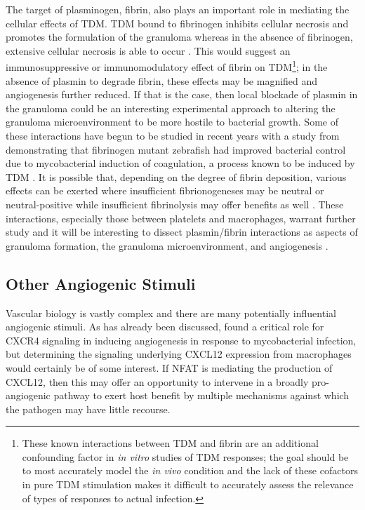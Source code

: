 The target of plasminogen, fibrin, also plays an important role in mediating the cellular effects of TDM. TDM bound to fibrinogen inhibits cellular necrosis and promotes the formulation of the granuloma whereas in the absence of fibrinogen, extensive cellular necrosis is able to occur \citep{Sakamoto2010}. This would suggest an immunosuppressive or immunomodulatory effect of fibrin on TDM\footnote{These known interactions between TDM and fibrin are an additional confounding factor in \textit{in vitro} studies of TDM responses; the goal should be to most accurately model the \textit{in vivo} condition and the lack of these cofactors in pure TDM stimulation makes it difficult to accurately assess the relevance of types of responses to actual infection.}; in the absence of plasmin to degrade fibrin, these effects may be magnified and angiogenesis further reduced. If that is the case, then local blockade of plasmin in the granuloma could be an interesting experimental approach to altering the granuloma microenvironment to be more hostile to bacterial growth. Some of these interactions have begun to be studied in recent years with a study from \citet{Hortle2019} demonstrating that fibrinogen mutant zebrafish had improved bacterial control due to mycobacterial induction of coagulation, a process known to be induced by TDM \citep{Retzinger1982, Retzinger1987, Donnachie2016}. It is possible that, depending on the degree of fibrin deposition, various effects can be exerted where insufficient fibrionogeneses may be neutral or neutral\hyp{}positive while insufficient fibrinolysis may offer benefits as well \citep{Venkatasubramanian2016}. These interactions, especially those between platelets and macrophages, warrant further study and it will be interesting to dissect plasmin/fibrin interactions as aspects of granuloma formation, the granuloma microenvironment, and angiogenesis \citep{Feng2014, LugoVillarino2014}.

\subsection{Other Angiogenic Stimuli}\label{otherang}

Vascular biology is vastly complex and there are many potentially influential angiogenic stimuli. As has already been discussed, \citet{Torraca2017} found a critical role for CXCR4 signaling in inducing angiogenesis in response to mycobacterial infection, but determining the signaling underlying CXCL12 expression from macrophages would certainly be of some interest. If NFAT is mediating the production of CXCL12, then this may offer an opportunity to intervene in a broadly pro\hyp{}angiogenic pathway to exert host benefit by multiple mechanisms against which the pathogen may have little recourse. 

